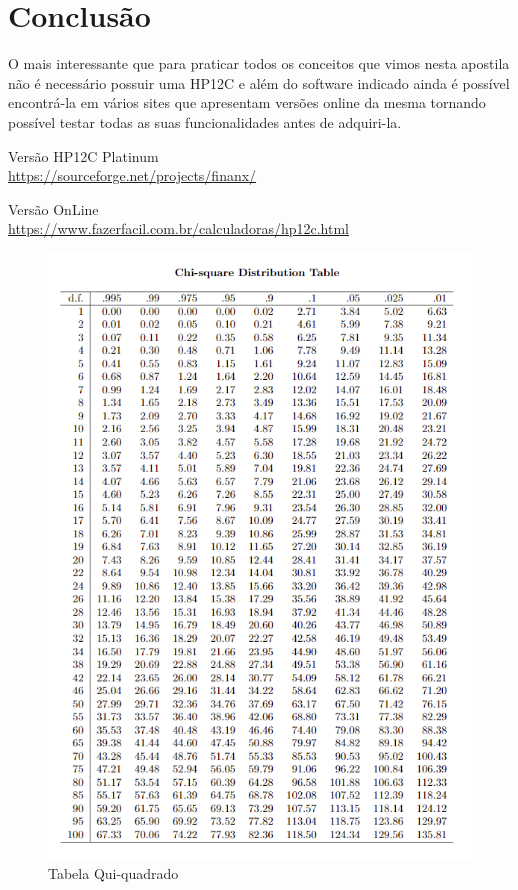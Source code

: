 \documentclass[fleqn,10pt]{../sty/SelfArx} %
\affiliation{} %
\begin{document}
	
\maketitle %
\thispagestyle{fancy} %





\section*{Conclusão}
O mais interessante que para praticar todos os conceitos que vimos nesta apostila não é necessário possuir uma HP12C e além do software indicado ainda é possível encontrá-la em vários sites \cite{online} que apresentam versões online da mesma tornando possível testar todas as suas funcionalidades antes de adquiri-la.



\begin{thebibliography}{4}
	Versão HP12C Platinum \\
	\url{https://sourceforge.net/projects/finanx/}
	
	Versão OnLine \\
	\url{https://www.fazerfacil.com.br/calculadoras/hp12c.html}
	
	
\end{thebibliography}

\newpage
\begin{figure}[H]
	\centering
	\includegraphics[width=1.0\textwidth]{images/tabela-chi-square}
	\caption{Tabela Qui-quadrado}
\end{figure}
\end{document}
